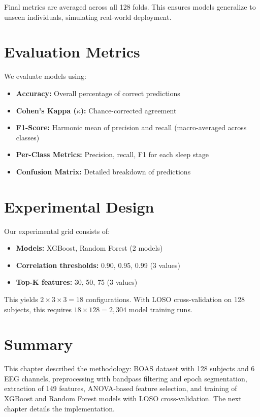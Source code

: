 Final metrics are averaged across all 128 folds. This ensures models generalize to unseen individuals, simulating real-world deployment.

\section{Evaluation Metrics}
\label{sec:metrics}

We evaluate models using:

\begin{itemize}
    \item \textbf{Accuracy:} Overall percentage of correct predictions
    \item \textbf{Cohen's Kappa ($\kappa$):} Chance-corrected agreement
    \item \textbf{F1-Score:} Harmonic mean of precision and recall (macro-averaged across classes)
    \item \textbf{Per-Class Metrics:} Precision, recall, F1 for each sleep stage
    \item \textbf{Confusion Matrix:} Detailed breakdown of predictions
\end{itemize}

\section{Experimental Design}
\label{sec:experimental_design}

Our experimental grid consists of:

\begin{itemize}
    \item \textbf{Models:} XGBoost, Random Forest (2 models)
    \item \textbf{Correlation thresholds:} 0.90, 0.95, 0.99 (3 values)
    \item \textbf{Top-K features:} 30, 50, 75 (3 values)
\end{itemize}

This yields $2 \times 3 \times 3 = 18$ configurations. With LOSO cross-validation on 128 subjects, this requires $18 \times 128 = 2{,}304$ model training runs.


\section{Summary}
\label{sec:method_summary}

This chapter described the methodology: BOAS dataset with 128 subjects and 6 EEG channels, preprocessing with bandpass filtering and epoch segmentation, extraction of 149 features, ANOVA-based feature selection, and training of XGBoost and Random Forest models with LOSO cross-validation. The next chapter details the implementation.
